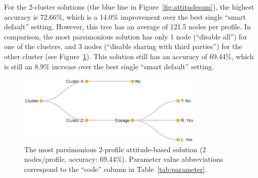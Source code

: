 %

For the 2-cluster solutions (the blue line in Figure~\ref{fig:attitudesum}), the highest accuracy is 72.66\%, which is a 14.0\% improvement over the best single ``smart default'' setting. However, this tree has an average of 121.5 nodes per profile. In comparison, the most parsimonious solution has only 1 node (``disable all'') for one of the clusters, and 3 nodes (``disable sharing with third parties'') for the other cluster (see Figure~\ref{fig:att_2_profile}). This solution still has an accuracy of 69.44\%, which is still an 8.9\% increase over the best single ``smart default'' setting.

\begin{figure}
	\centering
	\includegraphics[width=0.8\textwidth]{figures/fit_2_profile001.png}
	\caption{The most parsimonious 2-profile attitude-based solution (2 nodes/profile, accuracy: 69.44\%). Parameter value abbreviations correspond to the ``code'' column in Table~\ref{tab:parameter}.}
	\label{fig:att_2_profile}
\end{figure}

